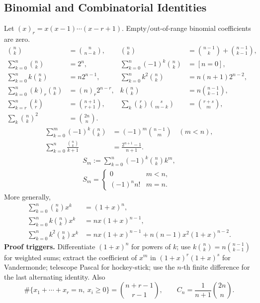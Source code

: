 \subsection*{Binomial and Combinatorial Identities}
Let $(x)_r=x(x-1)\cdots(x-r+1)$. Empty/out-of-range binomial
coefficients are zero.
\begin{align*}
\binom nk&=\binom n{n-k}, &
\binom nk&=\binom{n-1}k+\binom{n-1}{k-1},\\
\sum_{k=0}^{n}\binom nk&=2^n, &
\sum_{k=0}^{n}(-1)^k\binom nk&=[n=0],\\
\sum_{k=0}^{n}k\binom nk&=n2^{n-1}, &
\sum_{k=0}^{n}k^2\binom nk&=n(n+1)2^{n-2},\\
\sum_{k=0}^{n}(k)_r\binom nk&=(n)_r2^{n-r}, &
k\binom nk&=n\binom{n-1}{k-1},\\
\sum_{k=r}^{n}\binom kr&=\binom{n+1}{r+1}, &
\sum_k\binom rk\binom s{m-k}&=\binom{r+s}m,\\
\sum_k\binom nk^2&=\binom{2n}n.
\end{align*}
\begin{align*}
\sum_{k=0}^{m}(-1)^k\binom nk&=(-1)^m\binom{n-1}m\quad(m<n),\\
\sum_{k=0}^{n}\frac{\binom nk}{k+1}
  &=\frac{2^{n+1}-1}{n+1}.
\end{align*}
\begin{gather*}
S_m:=\sum_{k=0}^{n}(-1)^k\binom nk k^m,\\
S_m=\begin{cases}0&m<n,\\(-1)^n n!&m=n.\end{cases}
\end{gather*}
More generally,
\begin{align*}
\sum_{k=0}^{n}\binom nkx^k&=(1+x)^n,\\
\sum_{k=0}^{n}k\binom nkx^k&=nx(1+x)^{n-1},\\
\sum_{k=0}^{n}k^2\binom nkx^k
 &=nx(1+x)^{n-1}+n(n-1)x^2(1+x)^{n-2}.
\end{align*}
\textbf{Proof triggers.}
Differentiate $(1+x)^n$ for powers of $k$; use
$k\binom nk=n\binom{n-1}{k-1}$ for weighted sums; extract the
coefficient of $x^m$ in $(1+x)^r(1+x)^s$ for Vandermonde; telescope
Pascal for hockey-stick; use the $n$-th finite difference for the last
alternating identity. Also
\[\#\{x_1+\cdots+x_r=n,\ x_i\ge0\}=\binom{n+r-1}{r-1},\qquad
C_n=\frac1{n+1}\binom{2n}n.\]

